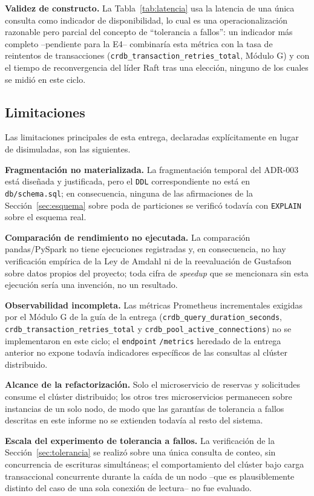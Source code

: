 \documentclass[10pt,twocolumn]{article}
\begin{document}
\textbf{Validez de constructo.} La Tabla~\ref{tab:latencia} usa la
latencia de una única consulta como indicador de disponibilidad, lo cual es
una operacionalización razonable pero parcial del concepto de
``tolerancia a fallos'': un indicador más completo --pendiente para la E4--
combinaría esta métrica con la tasa de reintentos de transacciones
(\texttt{crdb\_transaction\_retries\_total}, Módulo G) y con el tiempo de
reconvergencia del líder Raft tras una elección, ninguno de los cuales se
midió en este ciclo.

\subsection{Limitaciones}

Las limitaciones principales de esta entrega, declaradas explícitamente en
lugar de disimuladas, son las siguientes.

\textbf{Fragmentación no materializada.} La fragmentación temporal del
ADR-003 está diseñada y justificada, pero el \texttt{DDL} correspondiente
no está en \texttt{db/schema.sql}; en consecuencia, ninguna de las
afirmaciones de la Sección~\ref{sec:esquema} sobre poda de particiones se
verificó todavía con \texttt{EXPLAIN} sobre el esquema real.

\textbf{Comparación de rendimiento no ejecutada.} La comparación
pandas/PySpark no tiene ejecuciones registradas y, en consecuencia, no hay
verificación empírica de la Ley de Amdahl ni de la reevaluación de
Gustafson sobre datos propios del proyecto; toda cifra de \emph{speedup}
que se mencionara sin esta ejecución sería una invención, no un resultado.

\textbf{Observabilidad incompleta.} Las métricas Prometheus incrementales
exigidas por el Módulo G de la guía de la entrega
(\texttt{crdb\_query\_duration\_seconds},
\texttt{crdb\_transaction\_retries\_total} y
\texttt{crdb\_pool\_active\_connections}) no se implementaron en este
ciclo; el \texttt{endpoint} \texttt{/metrics} heredado de la entrega
anterior no expone todavía indicadores específicos de las consultas al
clúster distribuido.

\textbf{Alcance de la refactorización.} Solo el microservicio de
reservas y solicitudes consume el clúster distribuido; los otros tres
microservicios permanecen sobre instancias de un solo nodo, de modo que
las garantías de tolerancia a fallos descritas en este informe no se
extienden todavía al resto del sistema.

\textbf{Escala del experimento de tolerancia a fallos.} La verificación de
la Sección~\ref{sec:tolerancia} se realizó sobre una única consulta de
conteo, sin concurrencia de escrituras simultáneas; el comportamiento del
clúster bajo carga transaccional concurrente durante la caída de un nodo
--que es plausiblemente distinto del caso de una sola conexión de
lectura-- no fue evaluado.
\end{document}
